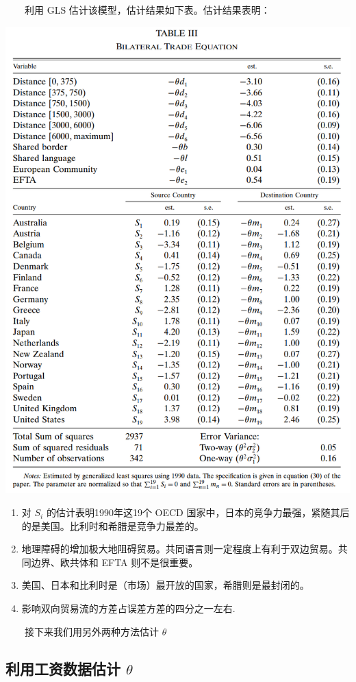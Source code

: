 \documentclass[
]{article}
\providecommand{\tightlist}{%
  \setlength{\itemsep}{0pt}\setlength{\parskip}{0pt}}
\begin{document}
　　利用 GLS 估计该模型，估计结果如下表。估计结果表明：

\begin{center}\includegraphics[width=0.8\linewidth]{Figures/Table3} \end{center}

\begin{enumerate}
\def\labelenumi{\arabic{enumi}.}
\tightlist
\item
  对 \(S_i\) 的估计表明1990年这19个 OECD 国家中，日本的竞争力最强，紧随其后的是美国。比利时和希腊是竞争力最差的。\\
\item
  地理障碍的增加极大地阻碍贸易。共同语言则一定程度上有利于双边贸易。共同边界、欧共体和 EFTA 则不是很重要。\\
\item
  美国、日本和比利时是（市场）最开放的国家，希腊则是最封闭的。\\
\item
  影响双向贸易流的方差占误差方差的四分之一左右.
\end{enumerate}

　　接下来我们用另外两种方法估计 \(\theta\)

\hypertarget{ux5229ux7528ux5de5ux8d44ux6570ux636eux4f30ux8ba1-theta}{%
\subsection{\texorpdfstring{利用工资数据估计 \(\theta\)}{利用工资数据估计 \textbackslash theta}}\label{ux5229ux7528ux5de5ux8d44ux6570ux636eux4f30ux8ba1-theta}}
\end{document}
